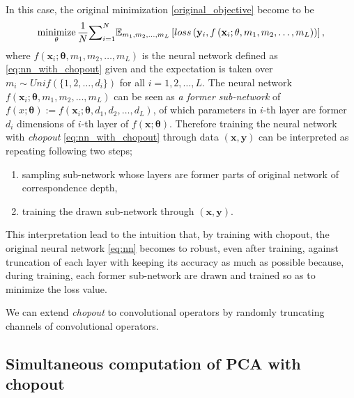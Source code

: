 \documentclass{article}
\newcommand{\minimize}{\mathop{\rm minimize}\limits}
\begin{document}
    In this case, the original minimization \ref{original_objective} become to be
    \begin{equation}
      \minimize_{\mathbf{\theta}} \frac{1}{N} 
      \mathbb{\sum}_{i=1}^N
       \mathbb{E}_{m_1, m_2, \dots, m_L}       
       \left[
       loss \left(\mathbf{y}_i, f\left(\mathbf{x}_i; \mathbf{\theta}, m_1, m_2, \dots, m_L\right)\right) 
       \right], 
       \label{objective_with_chopout}
    \end{equation}
    where $f(\mathbf{x}_i; \mathbf{\theta}, m_1, m_2, \dots, m_L)$ is the neural network defined as \ref{eq:nn_with_chopout} given and the expectation is taken over $m_i \sim Unif(\{1, 2, \dots, d_i\})$ for all $i=1,2,\dots,L$. The neural network $f\left(\mathbf{x}_i; \mathbf{\theta}, m_1, m_2, \dots, m_L\right)$ can be seen as \textit{a former sub-network} of $f(x;
    \mathbf{\theta}) := f(\mathbf{x}_i; \mathbf{\theta}, d_1, d_2, \dots, d_L)$, of which parameters in $i$-th layer are former $d_i$ dimensions of $i$-th layer of $f(\mathbf{x};\mathbf{\theta})$. Therefore training the neural network with \textit{chopout} \ref{eq:nn_with_chopout} through data $(\mathbf{x}, \mathbf{y})$ can be interpreted as repeating following two steps;
    \begin{enumerate}
      \item sampling sub-network whose layers are former parts of original network of correspondence depth,
      \item training the drawn sub-network through $(\mathbf{x}, \mathbf{y})$.
    \end{enumerate}

    This interpretation lead to the intuition that, by training with chopout, the original neural network \ref{eq:nn} becomes to robust, even after training, against truncation of each layer with keeping its accuracy as much as possible because, during training, each former sub-network are drawn and trained so as to minimize the loss value.

    We can extend \textit{chopout} to convolutional operators by randomly truncating channels of convolutional operators. 
    
    \subsection{Simultaneous computation of PCA with chopout}
    
\end{document}
